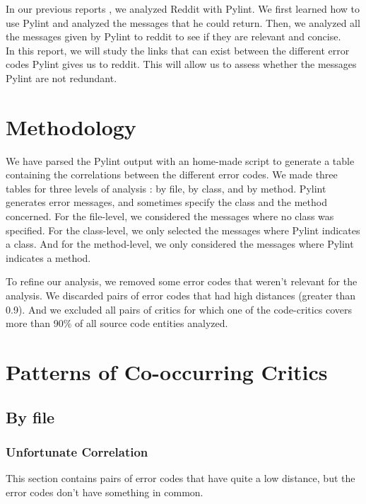 \documentclass[12pt, a4paper]{article}
\newcommand{\pyl}{\textsf{Pylint}}
\begin{document}
In our previous reports , we analyzed Reddit with \pyl{}.
We first learned how to use \pyl{} and analyzed the messages that he could return.
Then, we analyzed all the messages given by \pyl{} to reddit to see if they are relevant and concise.\\

In this report, we will study the links that can exist between the different error codes \pyl{} gives us to reddit.
This will allow us to assess whether the messages \pyl{} are not redundant.

\section{Methodology}

We have parsed the \pyl{} output with an home-made script to generate a table containing the correlations between the different error codes.
We made three tables for three levels of analysis : by file, by class, and by method.
\pyl{} generates error messages, and sometimes specify the class and the method concerned.
For the file-level, we considered the messages where no class was specified.
For the class-level, we only selected the messages where \pyl{} indicates a class.
And for the method-level, we only considered the messages where \pyl{} indicates a method.

\bigskip
To refine our analysis, we removed some error codes that weren't relevant for the analysis.
We discarded pairs of error codes that had high distances (greater than 0.9).
And we excluded all pairs of critics for which one of the code-critics covers more than 90\% of all source code entities analyzed.



\section{Patterns of Co-occurring Critics}

\subsection{By file}

\subsubsection*{Unfortunate Correlation}

This section contains pairs of error codes that have quite a low distance, but the error codes don't have something in common.
\end{document}
